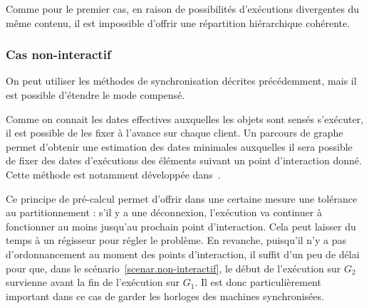 \documentclass[10pt]{article}
\newcommand\trigger{point d'interaction\xspace}
\begin{document}
\begin{itemize}
    Comme pour le premier cas, en raison de possibilités d'exécutions divergentes du même contenu, il est impossible d'offrir une répartition hiérarchique cohérente.
    
    \begin{figure}[h]
        \centering
        \begin{tikzpicture}
        
        \end{tikzpicture}
        \label{scenar.twobranches}
    \end{figure}

    
\end{itemize}



\subsubsection{Cas non-interactif}
On peut utiliser les méthodes de synchronisation décrites précédemment, mais il est possible d'étendre le mode compensé. 

Comme on connait les dates effectives auxquelles les objets sont sensés s'exécuter, il est possible de les fixer à l'avance sur chaque client. 
Un parcours de graphe permet d'obtenir une estimation des dates minimales auxquelles il sera possible de fixer des dates d'exécutions des éléments suivant un point d'interaction donné. 
Cette méthode est notamment développée dans~\cite{celerier2016rethinking}.

Ce principe de pré-calcul permet d'offrir dans une certaine mesure une tolérance au partitionnement : s'il y a une déconnexion, l'exécution va continuer à fonctionner au moins jusqu'au prochain \trigger.
Cela peut laisser du temps à un régisseur pour régler le problème.
En revanche, puisqu'il n'y a pas d'ordonnancement au moment des points d'interaction, il suffit d'un peu de délai pour que, dans le scénario~\ref{scenar.non-interactif}, le début de l'exécution sur $G_2$ survienne avant la fin de l'exécution sur $G_1$. 
Il est donc particulièrement important dans ce cas de garder les horloges des machines synchronisées.
\end{document}
